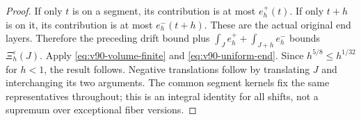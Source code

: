 \begin{proof}
If only $t$ is on a segment, its contribution is at most $e_h^+(t)$.
If only $t+h$ is on it, its contribution is at most $e_h^-(t+h)$.
These are the actual original end layers. Therefore the preceding
drift bound plus $\int_Je_h^++\int_{J+h}e_h^-$ bounds
$\Xi_h^\varepsilon(J)$. Apply \eqref{eq:v90-volume-finite} and
\eqref{eq:v90-uniform-end}. Since $h^{5/8}\le h^{1/32}$ for
$h<1$, the result follows. Negative translations follow by translating
$J$ and interchanging its two arguments. The common segment kernels
fix the same representatives throughout; this is an integral identity
for all shifts, not a supremum over exceptional fiber versions.
\end{proof}
